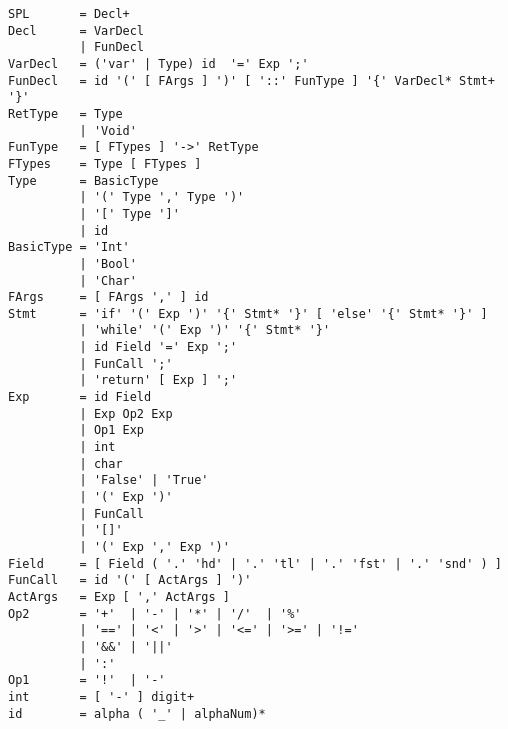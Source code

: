 \documentclass{report}
\begin{document}
\begin{verbatim}
SPL       = Decl+
Decl      = VarDecl
          | FunDecl
VarDecl   = ('var' | Type) id  '=' Exp ';'
FunDecl   = id '(' [ FArgs ] ')' [ '::' FunType ] '{' VarDecl* Stmt+ '}'
RetType   = Type
          | 'Void'
FunType   = [ FTypes ] '->' RetType
FTypes    = Type [ FTypes ]
Type      = BasicType
          | '(' Type ',' Type ')'
          | '[' Type ']'
          | id
BasicType = 'Int'
          | 'Bool'
          | 'Char'
FArgs     = [ FArgs ',' ] id
Stmt      = 'if' '(' Exp ')' '{' Stmt* '}' [ 'else' '{' Stmt* '}' ]
          | 'while' '(' Exp ')' '{' Stmt* '}'
          | id Field '=' Exp ';'
          | FunCall ';'
          | 'return' [ Exp ] ';'
Exp       = id Field
          | Exp Op2 Exp
          | Op1 Exp
          | int
          | char
          | 'False' | 'True'
          | '(' Exp ')'
          | FunCall
          | '[]'
          | '(' Exp ',' Exp ')'
Field     = [ Field ( '.' 'hd' | '.' 'tl' | '.' 'fst' | '.' 'snd' ) ]
FunCall   = id '(' [ ActArgs ] ')'
ActArgs   = Exp [ ',' ActArgs ]
Op2       = '+'  | '-' | '*' | '/'  | '%'
          | '==' | '<' | '>' | '<=' | '>=' | '!='
          | '&&' | '||'
          | ':'
Op1       = '!'  | '-'
int       = [ '-' ] digit+
id        = alpha ( '_' | alphaNum)*
\end{verbatim}
\end{document}
